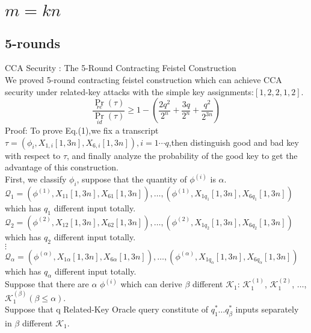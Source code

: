 \documentclass{article}
\begin{document}
\section{$m=kn$}
\subsection{5-rounds}
CCA Security : The 5-Round Contracting Feistel Construction\\
We proved 5-round contracting feistel construction which can achieve CCA security under related-key attacks with the simple key assignments:$[1,2,2,1,2]$.\\
\begin{equation}
\frac{\Pr_{re}(\tau)}{\Pr_{id}(\tau)}\geq 1-( \frac{2q^{2}}{2^{n}}+\frac{3q}{2^{n}} +\frac{q^{2}}{2^{3n}})
\end{equation}
Proof:
To prove Eq.(1),we fix a transcript $\tau=(\phi_{i},X_{1,i}[1,3n],X_{6,i}[1,3n]),i=1\cdots q$,then distinguish good and bad key with respect to $\tau$, and finally analyze the probability of the good key to get the advantage of this construction.\\

First, we classify $\phi_{i}$, suppose that the quantity of $\phi^{(i)}$ is $\alpha$.\\
$\mathcal{Q}_{1}={(\phi^{(1)},X_{11}[1,3n],X_{61}[1,3n]),\dots,(\phi^{(1)},X_{1q_{1}}[1,3n],X_{6q_{1}}[1,3n])}$ which has $q_{1}$ different input totally.\\
$\mathcal{Q}_{2}={(\phi^{(2)},X_{12}[1,3n],X_{62}[1,3n]),\dots,(\phi^{(2)},X_{1q_{2}}[1,3n],X_{6q_{2}}[1,3n])}$    which has $q_{2}$ different input totally.\\
\quad \quad $\vdots$ \\
$\mathcal{Q}_{\alpha}={(\phi^{(\alpha)},X_{1\alpha}[1,3n],X_{6\alpha}[1,3n]),\dots,(\phi^{(\alpha)},X_{1q_{\alpha}}[1,3n],X_{6q_{\alpha}}[1,3n])}$ which has $q_{\alpha}$ different input totally.\\

Suppose that there are $\alpha$ $\phi^{(i)}$ which can derive $\beta$ different $\mathcal{K}_{1}$: $\mathcal{K}_{1}^{(1)}$, $\mathcal{K}_{1}^{(2)}$, $\dots$,$\mathcal{K}_{1}^{(\beta)}$$(\beta\leq \alpha)$.\\
Suppose that q Related-Key Oracle query constitute of $q_{1}^{\ast} \dots q_{\beta}^{\ast}$ inputs separately in $\beta$ different $\mathcal{K}_{1}$.\\
\end{document}
